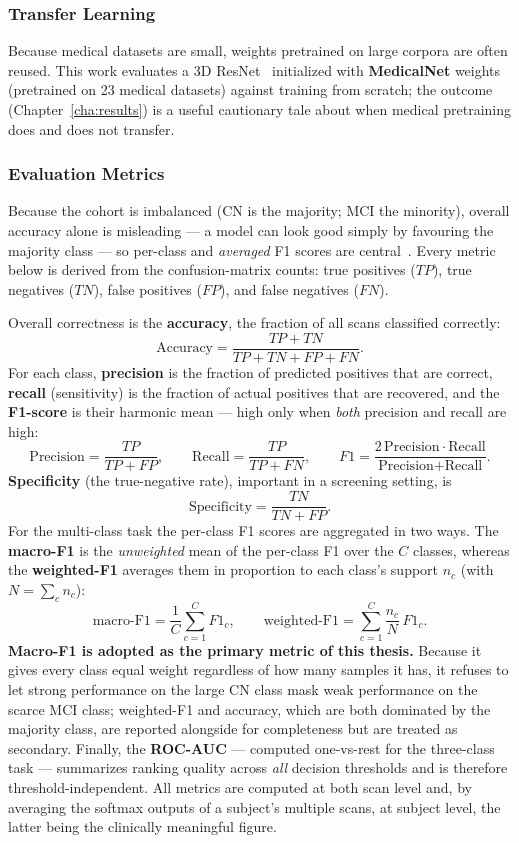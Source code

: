 \subsubsection{Transfer Learning}
Because medical datasets are small, weights pretrained on large corpora are often reused. This work evaluates a 3D ResNet~\cite{he2016deep} initialized with \textbf{MedicalNet} weights~\cite{chen2019med3d} (pretrained on 23 medical datasets) against training from scratch; the outcome (Chapter~\ref{cha:results}) is a useful cautionary tale about when medical pretraining does and does not transfer.

\subsubsection{Evaluation Metrics}
Because the cohort is imbalanced (CN is the majority; MCI the minority), overall accuracy alone is misleading --- a model can look good simply by favouring the majority class --- so per-class and \emph{averaged} F1 scores are central~\cite{powers2011evaluation}. Every metric below is derived from the confusion-matrix counts: true positives ($TP$), true negatives ($TN$), false positives ($FP$), and false negatives ($FN$).

Overall correctness is the \textbf{accuracy}, the fraction of all scans classified correctly:
\[
\text{Accuracy} = \frac{TP+TN}{TP+TN+FP+FN}.
\]
For each class, \textbf{precision} is the fraction of predicted positives that are correct, \textbf{recall} (sensitivity) is the fraction of actual positives that are recovered, and the \textbf{F1-score} is their harmonic mean --- high only when \emph{both} precision and recall are high:
\[
\text{Precision} = \frac{TP}{TP+FP}, \qquad
\text{Recall} = \frac{TP}{TP+FN}, \qquad
F1 = \frac{2\,\text{Precision}\cdot\text{Recall}}{\text{Precision}+\text{Recall}}.
\]
\textbf{Specificity} (the true-negative rate), important in a screening setting, is
\[
\text{Specificity} = \frac{TN}{TN+FP}.
\]
For the multi-class task the per-class F1 scores are aggregated in two ways. The \textbf{macro-F1} is the \emph{unweighted} mean of the per-class F1 over the $C$ classes, whereas the \textbf{weighted-F1} averages them in proportion to each class's support $n_c$ (with $N=\sum_c n_c$):
\[
\text{macro-F1} = \frac{1}{C}\sum_{c=1}^{C} F1_c, \qquad
\text{weighted-F1} = \sum_{c=1}^{C} \frac{n_c}{N}\, F1_c.
\]
\textbf{Macro-F1 is adopted as the primary metric of this thesis.} Because it gives every class equal weight regardless of how many samples it has, it refuses to let strong performance on the large CN class mask weak performance on the scarce MCI class; weighted-F1 and accuracy, which are both dominated by the majority class, are reported alongside for completeness but are treated as secondary. Finally, the \textbf{ROC-AUC} --- computed one-vs-rest for the three-class task --- summarizes ranking quality across \emph{all} decision thresholds and is therefore threshold-independent. All metrics are computed at both scan level and, by averaging the softmax outputs of a subject's multiple scans, at subject level, the latter being the clinically meaningful figure.

